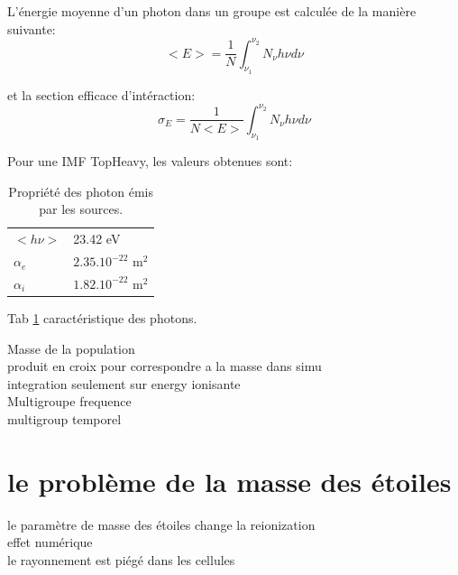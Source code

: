 L’énergie moyenne d'un photon dans un groupe est calculée de la manière suivante:
\begin{equation}
<E> = \frac{1}{N} \int_{\nu_1}^{\nu_2} N_\nu h \nu d\nu
\end{equation}

et la section efficace d'intéraction:
\begin{equation}
\sigma_E = \frac{1}{N<E>} \int_{\nu_1}^{\nu_2} N_\nu h \nu d\nu
\end{equation}

Pour une IMF TopHeavy, les valeurs obtenues sont:


\begin{table}
\begin{tabular}{l l }
	$<h\nu>$	&  23.42 eV \\
	$\alpha_e$	&  $2.35.10^{-22}$ m$^2$ \\
	$\alpha_i$	&  $1.82.10^{-22}$ m$^2$ \\
\end{tabular}
\caption{Propriété des photon émis par les sources.
\label{tab_photon}}
\end{table}

Tab \ref{tab_photon} caractéristique des photons.









Masse de la population\\
produit en croix pour correspondre a la masse dans simu\\
integration seulement sur energy ionisante\\

Multigroupe frequence\\
multigroup temporel\\


\section{le problème de la masse des étoiles}

le paramètre de masse des étoiles change la reionization\\
effet numérique\\
le rayonnement est piégé dans les cellules\\





